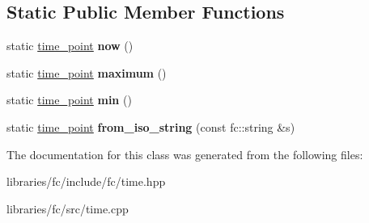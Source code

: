\subsection*{Static Public Member Functions}
\begin{DoxyCompactItemize}
\item 
\mbox{\label{classfc_1_1time__point_aa164ff1268a16d4b32afcff181f6100e}} 
static \mbox{\hyperlink{classfc_1_1time__point}{time\+\_\+point}} {\bfseries now} ()
\item 
\mbox{\label{classfc_1_1time__point_ae76e89eff3519239bd8346ce0f28a100}} 
static \mbox{\hyperlink{classfc_1_1time__point}{time\+\_\+point}} {\bfseries maximum} ()
\item 
\mbox{\label{classfc_1_1time__point_a29d4e1a74bc55af7c585952360573273}} 
static \mbox{\hyperlink{classfc_1_1time__point}{time\+\_\+point}} {\bfseries min} ()
\item 
\mbox{\label{classfc_1_1time__point_acf917831e171906dbbbd46b17bc6e0a5}} 
static \mbox{\hyperlink{classfc_1_1time__point}{time\+\_\+point}} {\bfseries from\+\_\+iso\+\_\+string} (const fc\+::string \&s)
\end{DoxyCompactItemize}


The documentation for this class was generated from the following files\+:\begin{DoxyCompactItemize}
\item 
libraries/fc/include/fc/time.\+hpp\item 
libraries/fc/src/time.\+cpp\end{DoxyCompactItemize}
